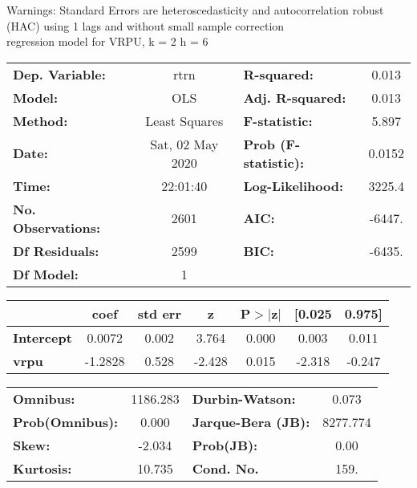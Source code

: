 Warnings: \newline
 [1] Standard Errors are heteroscedasticity and autocorrelation robust (HAC) using 1 lags and without small sample correction\\ 

regression model for VRPU, k = 2 h = 6\begin{center}
\begin{tabular}{lclc}
\toprule
\textbf{Dep. Variable:}    &       rtrn       & \textbf{  R-squared:         } &     0.013   \\
\textbf{Model:}            &       OLS        & \textbf{  Adj. R-squared:    } &     0.013   \\
\textbf{Method:}           &  Least Squares   & \textbf{  F-statistic:       } &     5.897   \\
\textbf{Date:}             & Sat, 02 May 2020 & \textbf{  Prob (F-statistic):} &   0.0152    \\
\textbf{Time:}             &     22:01:40     & \textbf{  Log-Likelihood:    } &    3225.4   \\
\textbf{No. Observations:} &        2601      & \textbf{  AIC:               } &    -6447.   \\
\textbf{Df Residuals:}     &        2599      & \textbf{  BIC:               } &    -6435.   \\
\textbf{Df Model:}         &           1      & \textbf{                     } &             \\
\bottomrule
\end{tabular}
\begin{tabular}{lcccccc}
                   & \textbf{coef} & \textbf{std err} & \textbf{z} & \textbf{P$> |$z$|$} & \textbf{[0.025} & \textbf{0.975]}  \\
\midrule
\textbf{Intercept} &       0.0072  &        0.002     &     3.764  &         0.000        &        0.003    &        0.011     \\
\textbf{vrpu}      &      -1.2828  &        0.528     &    -2.428  &         0.015        &       -2.318    &       -0.247     \\
\bottomrule
\end{tabular}
\begin{tabular}{lclc}
\textbf{Omnibus:}       & 1186.283 & \textbf{  Durbin-Watson:     } &    0.073  \\
\textbf{Prob(Omnibus):} &   0.000  & \textbf{  Jarque-Bera (JB):  } & 8277.774  \\
\textbf{Skew:}          &  -2.034  & \textbf{  Prob(JB):          } &     0.00  \\
\textbf{Kurtosis:}      &  10.735  & \textbf{  Cond. No.          } &     159.  \\
\bottomrule
\end{tabular}
\end{center}

